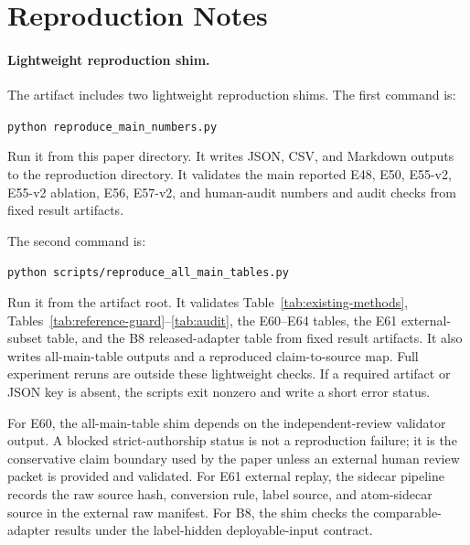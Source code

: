 \section{Reproduction Notes}
\label{sec:reproduction-notes}

\paragraph{Lightweight reproduction shim.}
The artifact includes two lightweight reproduction shims. The first command is:
\begin{flushleft}
\small\texttt{python reproduce\_main\_numbers.py}
\end{flushleft}
Run it from this paper directory. It writes JSON, CSV, and Markdown outputs to the reproduction directory. It validates the main reported E48, E50, E55-v2, E55-v2 ablation, E56, E57-v2, and human-audit numbers and audit checks from fixed result artifacts.

The second command is:
\begin{flushleft}
\small\texttt{python scripts/reproduce\_all\_main\_tables.py}
\end{flushleft}
Run it from the artifact root. It validates Table~\ref{tab:existing-methods}, Tables~\ref{tab:reference-guard}--\ref{tab:audit}, the E60--E64 tables, the E61 external-subset table, and the B8 released-adapter table from fixed result artifacts. It also writes all-main-table outputs and a reproduced claim-to-source map. Full experiment reruns are outside these lightweight checks. If a required artifact or JSON key is absent, the scripts exit nonzero and write a short error status.

For E60, the all-main-table shim depends on the independent-review validator output. A blocked strict-authorship status is not a reproduction failure; it is the conservative claim boundary used by the paper unless an external human review packet is provided and validated. For E61 external replay, the sidecar pipeline records the raw source hash, conversion rule, label source, and atom-sidecar source in the external raw manifest. For B8, the shim checks the comparable-adapter results under the label-hidden deployable-input contract.

